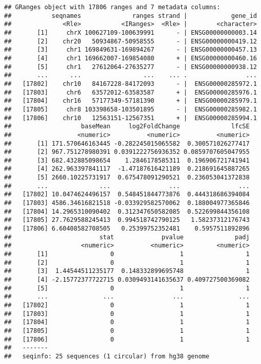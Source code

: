 \documentclass[
]{article}
\begin{document}
\begin{verbatim}
## GRanges object with 17806 ranges and 7 metadata columns:
##           seqnames              ranges strand |            gene_id
##              <Rle>           <IRanges>  <Rle> |        <character>
##       [1]     chrX 100627109-100639991      - | ENSG00000000003.14
##       [2]    chr20   50934867-50958555      - | ENSG00000000419.12
##       [3]     chr1 169849631-169894267      - | ENSG00000000457.13
##       [4]     chr1 169662007-169854080      + | ENSG00000000460.16
##       [5]     chr1   27612064-27635277      - | ENSG00000000938.12
##       ...      ...                 ...    ... .                ...
##   [17802]    chr10   84167228-84172093      - |  ENSG00000285972.1
##   [17803]     chr6   63572012-63583587      + |  ENSG00000285976.1
##   [17804]    chr16   57177349-57181390      + |  ENSG00000285979.1
##   [17805]     chr8 103398658-103501895      - |  ENSG00000285982.1
##   [17806]    chr10   12563151-12567351      + |  ENSG00000285994.1
##                   baseMean     log2FoldChange              lfcSE
##                  <numeric>          <numeric>          <numeric>
##       [1] 171.570646163445 -0.282245015065582  0.300571026277417
##       [2] 967.751278980391 0.0391222756936352 0.0859707605047955
##       [3] 682.432885098654    1.2846178585311  0.196906721741941
##       [4] 262.963397841117  -1.47187616421189  0.218691645887265
##       [5] 2660.10225731917  0.675478091290521  0.236053041372838
##       ...              ...                ...                ...
##   [17802] 10.0474624496157  0.548451844773876  0.444318686394084
##   [17803] 4586.34616821518 -0.033929582570062  0.188004977365846
##   [17804] 14.2965310090402  0.312347650582085  0.522699844356108
##   [17805] 27.7629588245413  0.994518742790125   1.58237312176743
##   [17806] 6.60408582708505   0.25399752352481    0.5957511892896
##                        stat             pvalue              padj
##                   <numeric>          <numeric>         <numeric>
##       [1]                 0                  1                 1
##       [2]                 0                  1                 1
##       [3]  1.44544511235177  0.148332899695748                 1
##       [4] -2.15772377722715 0.0309493141635637 0.409727500369082
##       [5]                 0                  1                 1
##       ...               ...                ...               ...
##   [17802]                 0                  1                 1
##   [17803]                 0                  1                 1
##   [17804]                 0                  1                 1
##   [17805]                 0                  1                 1
##   [17806]                 0                  1                 1
##   -------
##   seqinfo: 25 sequences (1 circular) from hg38 genome
\end{verbatim}
\end{document}
